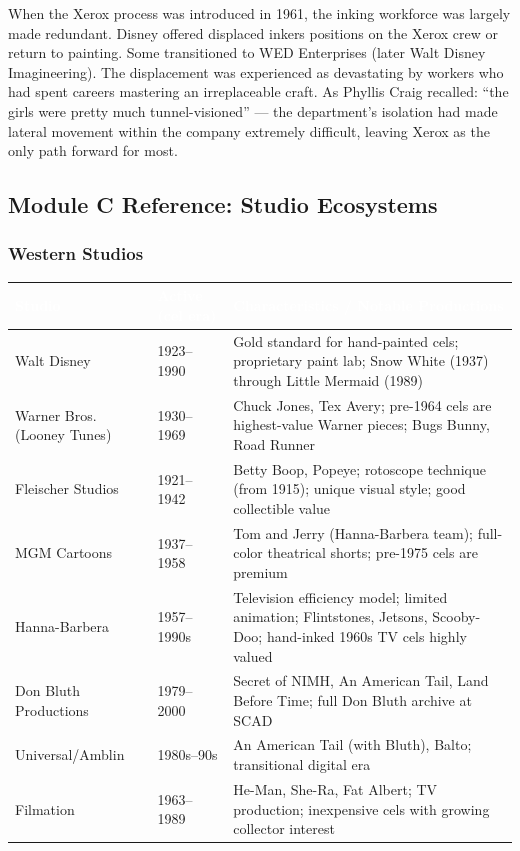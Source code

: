 \documentclass[11pt,letterpaper]{article}
\newcommand{\tableheader}[1]{\textbf{\sffamily\textcolor{white}{#1}}}
\begin{document}
When the Xerox process was introduced in 1961, the inking workforce was largely made redundant. Disney offered displaced inkers positions on the Xerox crew or return to painting. Some transitioned to WED Enterprises (later Walt Disney Imagineering). The displacement was experienced as devastating by workers who had spent careers mastering an irreplaceable craft. As Phyllis Craig recalled: ``the girls were pretty much tunnel-visioned'' --- the department's isolation had made lateral movement within the company extremely difficult, leaving Xerox as the only path forward for most.

\subsection{Module C Reference: Studio Ecosystems}

\subsubsection{Western Studios}

\begin{center}
\begin{tabularx}{\textwidth}{L{3cm}L{2.5cm}X}
\toprule
{}
\tableheader{Studio} & \tableheader{Active (cel era)} & \tableheader{Characteristics / Notable Productions} \\
\midrule
Walt Disney & 1923--1990 & Gold standard for hand-painted cels; proprietary paint lab; Snow White (1937) through Little Mermaid (1989) \\
Warner Bros. (Looney Tunes) & 1930--1969 & Chuck Jones, Tex Avery; pre-1964 cels are highest-value Warner pieces; Bugs Bunny, Road Runner \\
Fleischer Studios & 1921--1942 & Betty Boop, Popeye; rotoscope technique (from 1915); unique visual style; good collectible value \\
MGM Cartoons & 1937--1958 & Tom and Jerry (Hanna-Barbera team); full-color theatrical shorts; pre-1975 cels are premium \\
Hanna-Barbera & 1957--1990s & Television efficiency model; limited animation; Flintstones, Jetsons, Scooby-Doo; hand-inked 1960s TV cels highly valued \\
Don Bluth Productions & 1979--2000 & Secret of NIMH, An American Tail, Land Before Time; full Don Bluth archive at SCAD \\
Universal/Amblin & 1980s--90s & An American Tail (with Bluth), Balto; transitional digital era \\
Filmation & 1963--1989 & He-Man, She-Ra, Fat Albert; TV production; inexpensive cels with growing collector interest \\
\bottomrule
\end{tabularx}
\end{center}
\end{document}
